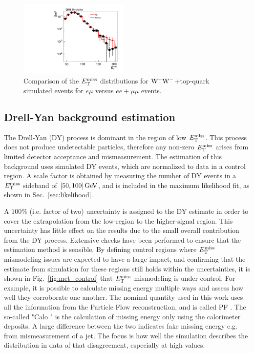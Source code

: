 \begin{figure}[hbtp]
\centering
\includegraphics[width=0.48\textwidth]{figures/met_tt_ww.pdf}
\caption{Comparison of the $E_\mathrm{T}^{\mathrm{miss}}$ distributions for $\mathrm{W}^+\mathrm{W}^-$+top-quark simulated 
events for $e\mu$ versus $ee+\mu\mu$ events.} 
\label{fig:met_tt_ww}
\end{figure}

\newpage
\subsection{Drell-Yan background estimation}
The Drell-Yan (DY) process is dominant in the region of low $E_{\mathrm{T}}^{\text{miss}}$.
This process does not produce undetectable particles, therefore any non-zero $E_{\mathrm{T}}^{\text{miss}}$ arises from
limited detector acceptance and mismeasurement.
The estimation of this background uses simulated DY events, which are normalized to data in a control region.
A scale factor is obtained by measuring the number of DY events in a $E_\mathrm{T}^{\mathrm{miss}}$ sideband of $[50, 100]\,\text{Ge\hspace{-.08em}V}$,
and is included in the maximum likelihood fit, as shown in Sec.~\ref{sec:likelihood}.

A $100\%$ (i.e. factor of two) uncertainty is assigned to the DY estimate in order to cover the extrapolation from the low-\met region to the higher-\met signal region.
This uncertainty has little effect on the results due to the small overall contribution from the DY process.
Extensive checks have been performed to ensure that the estimation method is sensible.
By defining control regions where $E_\mathrm{T}^{\mathrm{miss}}$ mismodeling issues are expected to have a large impact, and confirming that the 
estimate from simulation for these regions still holds within the uncertainties, it is shown in Fig.~\ref{fig:met_control} that $E_\mathrm{T}^{\mathrm{miss}}$ mismodeling is under control.
For example, it is possible to calculate missing energy multiple ways and assess how well they corroborate one another.
The nominal \met quantity used in this work uses all the information from the Particle Flow reconstruction, and is called PF \met.
The so-called "Calo \met" is the calculation of missing energy only using the calorimeter deposits.
A large difference between the two indicates fake missing energy e.g. from mismeasurement of a jet.
The focus is how well the simulation describes the distribution in data of that disagreement, especially at high values.

